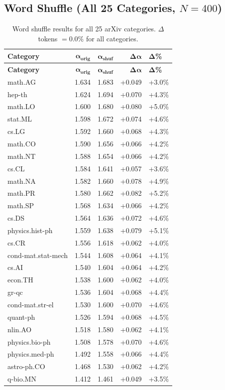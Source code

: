 \documentclass[11pt,letterpaper]{article}
\newcommand{\al}{\alpha}
\newcommand{\dalpha}{\Delta\alpha}
\begin{document}
\subsection{Word Shuffle (All 25 Categories, $N = 400$)}

\begin{longtable}{lrrrl}
\caption{Word shuffle results for all 25 arXiv categories.
$\Delta$tokens $= 0.0\%$ for all categories.} \\
\toprule
\textbf{Category} & $\boldsymbol{\al_{\text{orig}}}$ &
$\boldsymbol{\al_{\text{shuf}}}$ & $\boldsymbol{\dalpha}$ &
$\boldsymbol{\Delta}$\textbf{\%} \\
\midrule
\endfirsthead
\toprule
\textbf{Category} & $\boldsymbol{\al_{\text{orig}}}$ &
$\boldsymbol{\al_{\text{shuf}}}$ & $\boldsymbol{\dalpha}$ &
$\boldsymbol{\Delta}$\textbf{\%} \\
\midrule
\endhead
math.AG & 1.634 & 1.683 & +0.049 & +3.0\% \\
hep-th & 1.624 & 1.694 & +0.070 & +4.3\% \\
math.LO & 1.600 & 1.680 & +0.080 & +5.0\% \\
stat.ML & 1.598 & 1.672 & +0.074 & +4.6\% \\
cs.LG & 1.592 & 1.660 & +0.068 & +4.3\% \\
math.CO & 1.590 & 1.656 & +0.066 & +4.2\% \\
math.NT & 1.588 & 1.654 & +0.066 & +4.2\% \\
cs.CL & 1.584 & 1.641 & +0.057 & +3.6\% \\
math.NA & 1.582 & 1.660 & +0.078 & +4.9\% \\
math.PR & 1.580 & 1.662 & +0.082 & +5.2\% \\
math.SP & 1.568 & 1.634 & +0.066 & +4.2\% \\
cs.DS & 1.564 & 1.636 & +0.072 & +4.6\% \\
physics.hist-ph & 1.559 & 1.638 & +0.079 & +5.1\% \\
cs.CR & 1.556 & 1.618 & +0.062 & +4.0\% \\
cond-mat.stat-mech & 1.544 & 1.608 & +0.064 & +4.1\% \\
cs.AI & 1.540 & 1.604 & +0.064 & +4.2\% \\
econ.TH & 1.538 & 1.600 & +0.062 & +4.0\% \\
gr-qc & 1.536 & 1.604 & +0.068 & +4.4\% \\
cond-mat.str-el & 1.530 & 1.600 & +0.070 & +4.6\% \\
quant-ph & 1.526 & 1.594 & +0.068 & +4.5\% \\
nlin.AO & 1.518 & 1.580 & +0.062 & +4.1\% \\
physics.bio-ph & 1.508 & 1.578 & +0.070 & +4.6\% \\
physics.med-ph & 1.492 & 1.558 & +0.066 & +4.4\% \\
astro-ph.CO & 1.468 & 1.530 & +0.062 & +4.2\% \\
q-bio.MN & 1.412 & 1.461 & +0.049 & +3.5\% \\
\bottomrule
\end{longtable}
\end{document}
